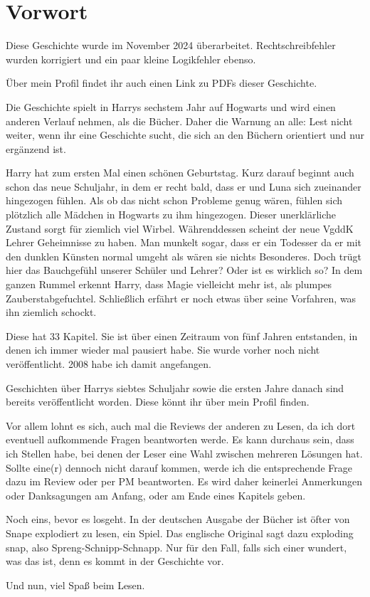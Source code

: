 \chapter{Vorwort}

Diese Geschichte wurde im November 2024 überarbeitet.
Rechtschreibfehler wurden korrigiert und ein paar kleine Logikfehler ebenso.

Über mein Profil findet ihr auch einen Link zu PDFs dieser Geschichte.



Die Geschichte spielt in Harrys sechstem Jahr auf Hogwarts und wird einen anderen Verlauf nehmen, als die Bücher. Daher die Warnung an alle: Lest nicht weiter, wenn ihr eine Geschichte sucht, die sich an den Büchern orientiert und nur ergänzend ist.

Harry hat zum ersten Mal einen schönen Geburtstag. Kurz darauf beginnt auch schon das neue Schuljahr, in dem er recht bald, dass er und Luna sich zueinander hingezogen fühlen. Als ob das nicht schon Probleme genug wären, fühlen sich plötzlich alle Mädchen in Hogwarts zu ihm hingezogen. Dieser unerklärliche Zustand sorgt für ziemlich viel Wirbel. Währenddessen scheint der neue VgddK Lehrer Geheimnisse zu haben. Man munkelt sogar, dass er ein Todesser da er mit den dunklen Künsten normal umgeht als wären sie nichts Besonderes. Doch trügt hier das Bauchgefühl unserer Schüler und Lehrer? Oder ist es wirklich so? In dem ganzen Rummel erkennt Harry, dass Magie vielleicht mehr ist, als plumpes Zauberstabgefuchtel. Schließlich erfährt er noch etwas über seine Vorfahren, was ihn ziemlich schockt.



Diese hat 33 Kapitel. Sie ist über einen Zeitraum von fünf Jahren entstanden, in denen ich immer wieder mal pausiert habe. Sie wurde vorher noch nicht veröffentlicht. 2008 habe ich damit angefangen.

Geschichten über Harrys siebtes Schuljahr sowie die ersten Jahre danach sind bereits veröffentlicht worden. 
Diese könnt ihr über mein Profil finden.

Vor allem lohnt es sich, auch mal die Reviews der anderen zu Lesen, da ich dort eventuell aufkommende Fragen beantworten werde. Es kann durchaus sein, dass ich Stellen habe, bei denen der Leser eine Wahl zwischen mehreren Lösungen hat. Sollte eine(r) dennoch nicht darauf kommen, werde ich die entsprechende Frage dazu im Review oder per PM beantworten. Es wird daher keinerlei Anmerkungen oder Danksagungen am Anfang, oder am Ende eines Kapitels geben.

Noch eins, bevor es losgeht. In der deutschen Ausgabe der Bücher ist öfter von Snape explodiert zu lesen, ein Spiel. Das englische Original sagt dazu exploding snap, also Spreng-Schnipp-Schnapp. Nur für den Fall, falls sich einer wundert, was das ist, denn es kommt in der Geschichte vor.

Und nun, viel Spaß beim Lesen.
